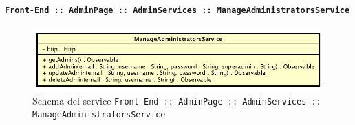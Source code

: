 \documentclass[../DefinizioneDiProdotto_v2.0.0.tex]{subfiles}
\begin{document}
				\paragraph{\texttt{Front-End :: AdminPage :: AdminServices :: ManageAdministratorsService}}
				\acapo
				\begin{figure}[!h]
					\centering
					\includegraphics[scale=0.6]{Architettura/Front-End/AdminPage/AdminServices/ManageAdministratorsService.png}
					\caption{Schema del service \texttt{Front-End :: AdminPage :: AdminServices :: ManageAdministratorsService}}
				\end{figure}
\end{document}
